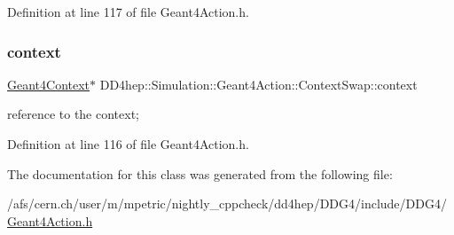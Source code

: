Definition at line 117 of file Geant4\+Action.\+h.

\hypertarget{class_d_d4hep_1_1_simulation_1_1_geant4_action_1_1_context_swap_aacd9a019417cad92349a8cd6597941c4}{}\label{class_d_d4hep_1_1_simulation_1_1_geant4_action_1_1_context_swap_aacd9a019417cad92349a8cd6597941c4} 
\subsubsection{\texorpdfstring{context}{context}}
{\footnotesize\ttfamily \hyperlink{class_d_d4hep_1_1_simulation_1_1_geant4_context}{Geant4\+Context}$\ast$ D\+D4hep\+::\+Simulation\+::\+Geant4\+Action\+::\+Context\+Swap\+::context\hspace{0.3cm}{\ttfamily [private]}}



reference to the context; 



Definition at line 116 of file Geant4\+Action.\+h.



The documentation for this class was generated from the following file\+:\begin{DoxyCompactItemize}
\item 
/afs/cern.\+ch/user/m/mpetric/nightly\+\_\+cppcheck/dd4hep/\+D\+D\+G4/include/\+D\+D\+G4/\hyperlink{_geant4_action_8h}{Geant4\+Action.\+h}\end{DoxyCompactItemize}
